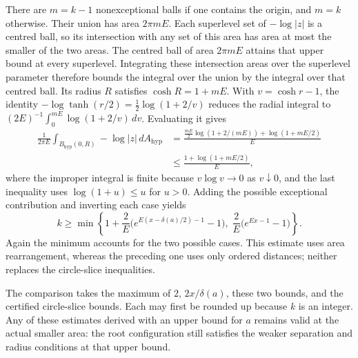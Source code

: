 There are $m=k-1$ nonexceptional balls if one contains the origin, and
$m=k$ otherwise. Their union has area $2\pi mE$. Each superlevel set of
$-\log|z|$ is a centred ball, so its intersection with any set of this
area has area at most the smaller of the two areas. The centred ball
of area $2\pi mE$ attains that upper bound at every superlevel.
Integrating these intersection areas over the superlevel parameter
therefore bounds the integral over the union by the integral over that
centred ball. Its radius $R$ satisfies $\cosh R=1+mE$.
With $v=\cosh r-1$, the identity
$-\log\tanh(r/2)=\tfrac12\log(1+2/v)$ reduces the radial integral to
$(2E)^{-1}\int_0^{mE}\log(1+2/v)\,dv$. Evaluating it gives
\begin{align*}
 \frac1{2\pi E}\int_{B_{\mathrm{hyp}}(0,R)}-\log|z|\,dA_{\mathrm{hyp}}
 &=\frac{\frac{mE}{2}\log(1+2/(mE))+\log(1+mE/2)}{E}\\
 &\le\frac{1+\log(1+mE/2)}{E},
\end{align*}
where the improper integral is finite because $v\log v\to0$ as
$v\downarrow0$, and the last inequality uses $\log(1+u)\le u$ for $u>0$.
Adding the possible exceptional contribution and inverting each case yields
\[
 k\ge\min\left\{
  1+\frac2E\bigl(e^{E(x-\delta(a)/2)-1}-1\bigr),\;
  \frac2E\bigl(e^{Ex-1}-1\bigr)\right\}.
\]
Again the minimum accounts for the two possible cases. This estimate uses
area rearrangement, whereas the preceding one uses only ordered distances;
neither replaces the circle-slice inequalities.

The comparison takes the maximum of $2$, $2x/\delta(a)$, these two bounds,
and the certified circle-slice bounds. Each may first be rounded up because
$k$ is an integer. Any of these estimates derived with an upper bound for
$a$ remains valid at the actual smaller area: the root configuration still
satisfies the weaker separation and radius conditions at that upper bound.

